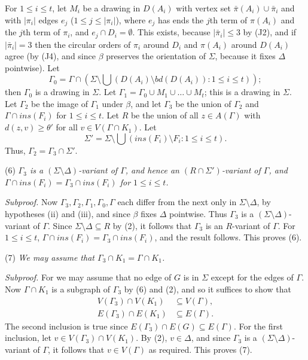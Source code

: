 For $1 \le i \le t$, let $M_i$ be a drawing in $D(A_i)$ with vertex set $\bar{\pi}(A_i) \cup \bar{\pi}_i$ and with $|\pi_i|$ edges $e_j$ ($1 \le j \le |\pi_i|$), where $e_j$ has ends the $j$th term of $\pi(A_i)$ and the $j$th term of $\pi_i$, and $e_j \cap D_i = \emptyset$. This exists, because $|\bar{\pi}_i| \le 3$ by (J2), and if $|\bar{\pi}_i| = 3$ then the circular orders of $\pi_i$ around $D_i$ and $\pi(A_i)$ around $D(A_i)$ agree (by (J4), and since $\beta$ preserves the orientation of $\Sigma$, because it fixes $\Delta$ pointwise). Let
\begin{equation*}
\Gamma_0 = \Gamma \cap \left(\Sigma \setminus \bigcup(D(A_i) \setminus bd(D(A_i)) : 1 \le i \le t)\right);
\end{equation*}
then $\Gamma_0$ is a drawing in $\Sigma$. Let $\Gamma_1 = \Gamma_0 \cup M_1 \cup \dots \cup M_t$; this is a drawing in $\Sigma$. Let $\Gamma_2$ be the image of $\Gamma_1$ under $\beta$, and let $\Gamma_3$ be the union of $\Gamma_2$ and $\Gamma \cap ins(F_i)$ for $1 \le i \le t$. Let $R$ be the union of all $z \in A(\Gamma)$ with $d(z, v) \ge \theta'$ for all $v \in V(\Gamma \cap K_1)$. Let
\begin{equation*}
\Sigma' = \Sigma \setminus \bigcup(ins(F_i) \setminus F_i : 1 \le i \le t).
\end{equation*}
Thus, $\Gamma_2 = \Gamma_3 \cap \Sigma'$.

\hspace*{12pt}(6) \textit{$\Gamma_3$ is a $(\Sigma \setminus \Delta)$-variant of $\Gamma$, and hence an $(R \cap \Sigma')$-variant of $\Gamma$, and $\Gamma \cap ins(F_i) = \Gamma_3 \cap ins(F_i)$ for $1 \le i \le t$.}

\textit{Subproof.} Now $\Gamma_3, \Gamma_2, \Gamma_1, \Gamma_0, \Gamma$ each differ from the next only in $\Sigma \setminus \Delta$, by hypotheses (ii) and (iii), and since $\beta$ fixes $\Delta$ pointwise. Thus $\Gamma_3$ is a $(\Sigma \setminus \Delta)$-variant of $\Gamma$. Since $\Sigma \setminus \Delta \subseteq R$ by (2), it follows that $\Gamma_3$ is an $R$-variant of $\Gamma$. For $1 \le i \le t$, $\Gamma \cap ins(F_i) = \Gamma_3 \cap ins(F_i)$, and the result follows. This proves (6).

\hspace*{12pt}(7) \textit{We may assume that $\Gamma_3 \cap K_1 = \Gamma \cap K_1$.}

\textit{Subproof.} For we may assume that no edge of $G$ is in $\Sigma$ except for the edges of $\Gamma$. Now $\Gamma \cap K_1$ is a subgraph of $\Gamma_3$ by (6) and (2), and so it suffices to show that
\begin{align*}
V(\Gamma_3) \cap V(K_1) &\subseteq V(\Gamma), \\
E(\Gamma_3) \cap E(K_1) &\subseteq E(\Gamma).
\end{align*}
The second inclusion is true since $E(\Gamma_3) \cap E(G) \subseteq E(\Gamma)$. For the first inclusion, let $v \in V(\Gamma_3) \cap V(K_1)$. By (2), $v \in \Delta$, and since $\Gamma_3$ is a $(\Sigma \setminus \Delta)$-variant of $\Gamma$, it follows that $v \in V(\Gamma)$ as required. This proves (7).

